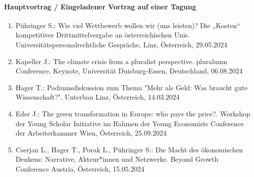 \paragraph{Hauptvortrag / Eingeladener Vortrag auf einer Tagung}
\begin{enumerate}
	\item Pühringer S.: Wie viel Wettbewerb wollen wir (uns leisten)? Die „Kosten“ kompetitiver Drittmittelvergabe an österreichischen Unis. Universitätspersonalrechtliche Gespräche, Linz, Österreich, 29.05.2024
	\item Kapeller J.: The climate crisis from a pluralist perspective. pluralumn Conference, Keynote, Universität Duisburg-Essen, Deutschland, 06.08.2024
	\item Hager T.: Podiumsdiskussion zum Thema "Mehr als Geld: Was braucht gute Wissenschaft?". Unterbau Linz, Österreich, 14.03.2024
	\item Eder J.: The green transformation in Europe: who pays the price?. Workshop der Young Scholar Initiative im Rahmen der Young Economists Conference der Arbeiterkammer Wien, Österreich, 25.09.2024
	\item Cserjan L., Hager T., Porak L., Pühringer S.: Die Macht des ökonomischen Denkens: Narrative, Akteur*innen und Netzwerke. Beyond Growth Conference Austria, Österreich, 15.05.2024
\end{enumerate}
